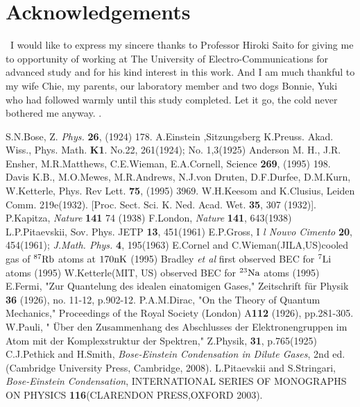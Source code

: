 \documentclass[12pt,a4paper]{report}
\begin{document}
\chapter*{Acknowledgements}
\ I would like to express my sincere thanks to Professor Hiroki Saito for
giving me to opportunity of working at The University of Electro-Communications
for advanced study and for his kind interest in this work.
And I am much thankful to my wife Chie, my parents, our laboratory member and two dogs Bonnie, Yuki who had followed
warmly until this study completed. Let it go, the cold never bothered me anyway. \cite{81}.

\begin{thebibliography}{81}
 S.N.Bose, Z. {\em Phys.} {\bf 26}, (1924) 178.
 A.Einstein ,Sitzungsberg K.Preuss. Akad. Wiss., Phys. Math. {\bf K1}. No.22, 261(1924); No. 1,3(1925)
 Anderson M. H., J.R. Ensher, M.R.Matthews, C.E.Wieman, E.A.Cornell, Science {\bf 269}, (1995) 198.
 Davis K.B., M.O.Mewes, M.R.Andrews, N.J.von Druten, D.F.Durfee, D.M.Kurn, W.Ketterle, Phys. Rev Lett. {\bf 75}, (1995) 3969.
 W.H.Keesom and K.Clusius, Leiden Comm. 219e(1932). [Proc. Sect. Sci. K. Ned. Acad. Wet. {\bf 35}, 307 (1932)].
 P.Kapitza, {\em Nature} {\bf 141} 74 (1938)
 F.London, {\em Nature} {\bf 141}, 643(1938)
 L.P.Pitaevskii, Sov. Phys. JETP {\bf 13}, 451(1961)
 E.P.Gross, I {\em l Nouvo Cimento} {\bf 20}, 454(1961); {\em J.Math. Phys.} {\bf 4}, 195(1963)
 E.Cornel and C.Wieman(JILA,US)cooled gas of $^{87} {\rm Rb}$ atoms at $170 {\rm nK}$ (1995)
 Bradley {\it et al} first observed BEC for $^{7} {\rm Li}$ atoms (1995)
 W.Ketterle(MIT, US) observed BEC for $^{23} {\rm Na}$ atoms (1995)
 E.Fermi, "Zur Quantelung des idealen einatomigen Gases," Zeitschrift f\"{u}r Physik {\bf 36} (1926), no. 11-12, p.902-12.
 P.A.M.Dirac, "On the Theory of Quantum Mechanics," Proceedings of the Royal Society (London) A{\bf 112} (1926), pp.281-305.
 W.Pauli, " \"{U}ber den Zusammenhang des Abschlusses der Elektronengruppen im Atom mit der Komplexstruktur der Spektren," Z.Physik, {\bf 31}, p.765(1925)
 C.J.Pethick and H.Smith, {\it Bose-Einstein Condensation in Dilute Gases}, 2nd ed. (Cambridge University Press, Cambridge, 2008).
 L.Pitaevskii and S.Stringari, {\it Bose-Einstein Condensation}, INTERNATIONAL SERIES OF MONOGRAPHS ON PHYSICS {\bf 116}(CLARENDON PRESS,OXFORD 2003).

\end{thebibliography}
\end{document}
